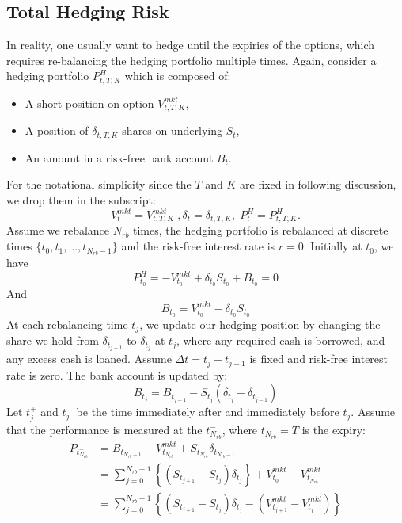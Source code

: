 \documentclass[letterpaper,12pt,titlepage,oneside,final]{book}
\numberwithin{equation}{section}
\theoremstyle{definition}
\newcommand{\DT}{\Delta t}
\newcommand{\Vmkt}{V^{mkt}}
\newcommand{\Smkt}{S}
\begin{document}

\subsection{Total Hedging Risk}
\label{sec:DiscreteTotalRisk}
In reality, one usually want to hedge until the expiries of the options, which requires re-balancing the hedging portfolio multiple times.  
Again,
consider a hedging portfolio $P^{H}_{t,T,K}$ which is composed of:
\begin{itemize}
	\item A short position on option $\Vmkt_{t,T,K}$,
	\item A position of $\delta_{t,T,K}$ shares on underlying $\Smkt_{t}$,
	\item An amount in a risk-free bank account $B_t$.
\end{itemize}
For the notational simplicity since the $T$ and $K$ are fixed in following discussion, we drop them in the subscript:
\[
    \Vmkt_{t}=\Vmkt_{t,T,K}\;,\delta_{t}=\delta_{t,T,K},\; P^{H}_t=P^{H}_{t,T,K}.
\]
Assume we rebalance $N_{rb}$ times, the hedging portfolio is rebalanced at discrete times $\{t_0,t_1,\dots,t_{N_{rb}-1}\}$ and the risk-free interest rate is $r=0$.
Initially at $t_0$, we have
\[
P^H_{t_0}=  -V_{t_0}^{mkt}+\delta_{t_0} S_{t_0}+ B_{t_0}=0
\]
And
\[
B_{t_0}=V_{t_0}^{mkt}-\delta_{t_0} S_{t_0}
\]
At each rebalancing time $t_j$, we update our hedging position by changing the share we hold from $\delta_{t_{j-1}}$ to $\delta_{t_j}$ at $t_j$, where any required cash is borrowed, and any excess cash is loaned. Assume $\Delta t=t_{j}-t_{j-1}$ is fixed and risk-free interest rate is zero.
The bank account is updated by:
\[
B_{t_{j}}= B_{t_{j-1}}-S_{t_j}(\delta_{t_j}-\delta_{t_{j-1}})
\]
Let $t_j^+$ and $t_j^-$   be the time immediately after  and immediately before $t_j$. Assume that the performance is measured at the $t_{N_{rb}}^-$, where $t_{N_{rb}}=T$ is the expiry:
\begin{equation}
\begin{split}
P_{t_{N_{rb}}^-}&=B_{t_{N_{rb}-1}}- V_{t_{N_{rb}}}^{mkt}+ S_{t_{N_{rb}}} \delta_{t_{N_{rb}-1}}  \\
&=\sum_{j=0}^{N_{rb}-1}\left\{ \left(S_{t_{j+1}}-S_{t_{j}}\right) \delta_{t_j} \right\}+ V_{t_0}^{mkt}-V_{t_{N_{rb}}}^{mkt}\\
&=\sum_{j=0}^{N_{rb}-1}\left\{ \left( S_{t_{j+1}}-S_{t_{j}}\right) \delta_{t_j} -(V_{t_{j+1}}^{mkt}-V_{t_j}^{mkt}) \right\}
\end{split}
\label{eq:TotalObj}
\end{equation}
\end{document}
